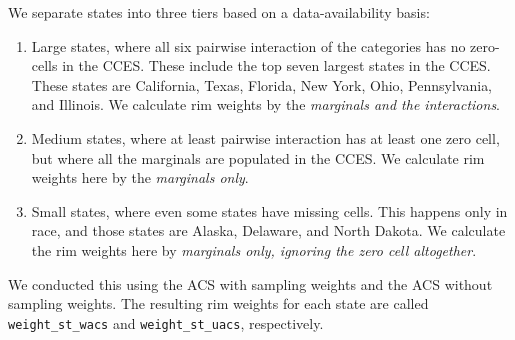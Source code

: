 \documentclass[11pt]{article}
\begin{document}
We separate states into three tiers based on a data-availability basis:
\begin{enumerate}
    \item Large states, where all six pairwise interaction of the categories has no zero-cells in the CCES. These include the top seven largest states in the CCES. These states are California, Texas, Florida, New York, Ohio, Pennsylvania, and Illinois. We calculate rim weights by the \emph{marginals and the interactions}.
    \item Medium states, where at least pairwise interaction has at least one zero cell, but where all the marginals are populated in the CCES. We calculate rim weights here by the \emph{marginals only}.
    \item Small states, where even some states have missing cells. This happens only in race, and those states are Alaska, Delaware, and North Dakota. We calculate the rim weights here by \emph{marginals only, ignoring the zero cell altogether}.
\end{enumerate}


We conducted this using the ACS with sampling weights and the ACS without sampling weights. The resulting rim weights for each state are called \texttt{weight\_st\_wacs} and \texttt{weight\_st\_uacs}, respectively.
\end{document}
